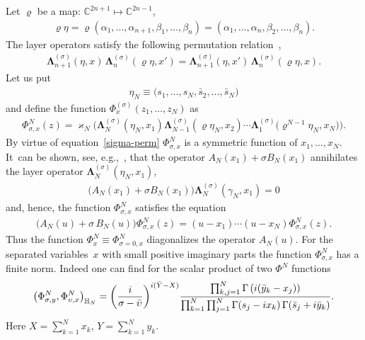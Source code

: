 \documentclass[11pt]{article}
\numberwithin{equation}{section}
\numberwithin{equation}{section}
\begin{document}
Let $\varrho$ be a map: $\mathbb C^{2n+1}\mapsto \mathbb C^{2n-1}$,
\begin{gather*}
\varrho\eta=\varrho(\alpha_1,\dots,\alpha_{n+1},\beta_{1},\dots,\beta_n)
=(\alpha_1,\dots,\alpha_n,\beta_{2},\dots,\beta_{n}).
\end{gather*}
The layer operators satisfy the following permutation relation~\cite{Belitsky:2014rba},
\begin{gather}\label{sigma-perm}
\boldsymbol\Lambda^{(\sigma)}_{n+1}(\eta,x)\,\boldsymbol\Lambda^{(\sigma)}_n(\varrho\eta,x')
 =\boldsymbol\Lambda^{(\sigma)}_{n+1}(\eta,x')\,\boldsymbol\Lambda^{(\sigma)}_n(\varrho\eta,x).
\end{gather}
Let us put
\begin{gather}\label{gammaNAB}
\eta_N\equiv\big( s_1,\dots, s_N, \bar s_2,\dots, \bar s_N\big)
\end{gather}
and define the function $\Phi^{(\sigma)}_{{x}}(z_1,\dots,z_N)$ as
\begin{gather*}%
 \Phi^{N}_{\sigma,{x}}(z)=\varkappa_N \Big( \boldsymbol\Lambda^{(\sigma)}_N(\eta_N, x_1)
 \boldsymbol\Lambda^{(\sigma)}_{N-1}(\varrho\eta_N, x_2)\cdots \boldsymbol\Lambda^{(\sigma)}_1\big(\varrho^{N-1}\eta_N, x_{N}\big)\Big).
\end{gather*}
By virtue of equation~\eqref{sigma-perm} $ \Phi^{N}_{\sigma,{x}} $ is a symmetric function of $x_1,\dots,x_N$. It~can be shown, see, e.g.,~\cite{Derkachov:2002tf}, that the operator $A_N(x_1)+\sigma B_N(x_1)$ annihilates the layer operator $
\boldsymbol\Lambda^{(\sigma)}_N(\eta_N, x_1)$,
\begin{gather*}
\big(A_N(x_1)+\sigma B_N(x_1)\big)\boldsymbol\Lambda^{(\sigma)}_N(\gamma_N, x_1)=0
\end{gather*}
and, hence, the function $\Phi^N_{\sigma,{x}}$ satisfies the equation
\begin{gather*}
\big(A_N(u)+\sigma\, B_N(u)\big)\Phi^N_{\sigma,{x}}( z)=
(u-x_1)\cdots(u-x_N)\Phi^N_{\sigma,{x}}( z).
\end{gather*}
Thus the function $\Phi^N_{{x}}\equiv\Phi^N_{\sigma=0,{x}}$ diagonalizes the operator $A_N(u)$.
 For the
separated variables~$x$ with small positive imaginary parts the function $\Phi^N_{\sigma,x}$ has a finite norm. Indeed one can find for the
scalar product of two $\Phi^N$ functions~\cite{Belitsky:2014rba}
\begin{gather}
\label{s-product-T}
\big(\Phi^N_{\sigma, y}, \Phi^N_{\upsilon, x}\big)_{\mathbb H_N} =
 \bigg(\frac {\rm i}{\sigma-\bar\upsilon}\bigg)^{{\rm i}(\bar Y-X)}
\frac{\prod_{k,j=1}^N \Gamma\left({\rm i}(\bar y_k-x_j)\right)
}{\prod_{k=1}^{N}\prod_{j=1}^N\Gamma( s_j-{\rm i}x_k)\,\Gamma(\bar s_j+ {\rm i}\bar y_k)}.
\end{gather}
Here $X=\sum_{k=1}^N x_k$, $Y=\sum_{k=1}^N y_k$.
\smallskip
\end{document}
